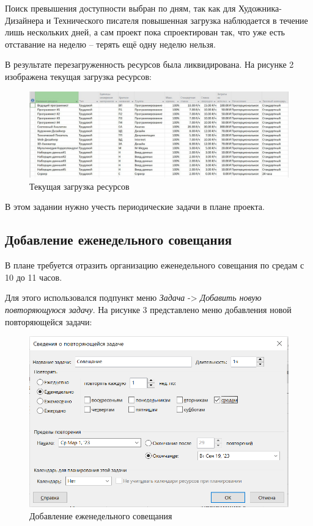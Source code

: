 Поиск превышения доступности выбран по дням, так как для Художника-Дизайнера и Технического писателя повышенная загрузка наблюдается в течение лишь нескольких дней, а сам проект пока спроектирован так, что уже есть отставание на неделю -- терять ещё одну неделю нельзя.

В результате перезагруженность ресурсов была ликвидирована.
На рисунке 2 изображена текущая загрузка ресурсов:
\FloatBarrier
\begin{figure}[h]	
	\begin{center}
		\includegraphics[width=\linewidth]{inc/1-2.jpeg}
	\end{center}
	\captionsetup{justification=centering}
	\caption{Текущая загрузка ресурсов}
\end{figure}
\FloatBarrier 

\newpage
{}
В этом задании нужно учесть периодические задачи в плане проекта.

\subsection*{Добавление еженедельного совещания}
В плане требуется отразить организацию еженедельного совещания по средам с 10 до 11 часов.

Для этого использовался подпункт меню \textit{Задача} -> \textit{Добавить новую повторяющуюся задачу}.
На рисунке 3 представлено меню добавления новой повторяющейся задачи:
\FloatBarrier
\begin{figure}[h]	
	\begin{center}
		\includegraphics[width=\linewidth]{inc/rep.png}
	\end{center}
	\captionsetup{justification=centering}
	\caption{Добавление еженедельного совещания}
\end{figure}
\FloatBarrier 

